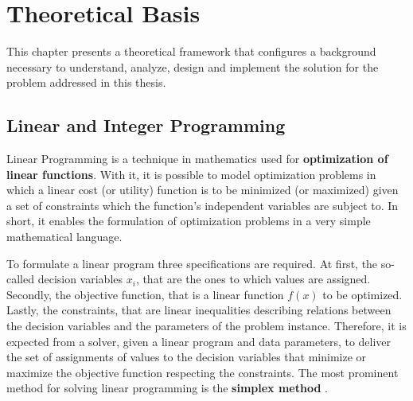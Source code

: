 \documentclass[tuberlin,cic,tc,openright,english,noabntcite,oneside]{iiufrgs}
\begin{document}
\chapter{Theoretical Basis}
This chapter presents a theoretical framework that configures a background necessary to understand, analyze, design and implement the solution for the problem addressed in this thesis.


\section{Linear and Integer Programming}
Linear Programming is a technique in mathematics used for \textbf{optimization of linear functions}. With it, it is possible to model optimization problems in which a linear cost (or utility) function is to be minimized (or maximized) given a set of constraints which the function's independent variables are subject to. In short, it enables the formulation of optimization problems in a very simple mathematical language.

To formulate a linear program three specifications are required. At first, the so-called decision variables $x_{i}$, that are the ones to which values are assigned. Secondly, the objective function, that is a linear function $f(x)$ to be optimized. Lastly, the constraints, that are linear inequalities describing relations between the decision variables and the parameters of the problem instance. Therefore, it is expected from a solver, given a linear program and data parameters, to deliver the set of assignments of values to the decision variables that minimize or maximize the objective function respecting the constraints. The most prominent method for solving linear programming is the \textbf{simplex method} \parencite[p. 5-6]{shenoy_linear_2007}.
\end{document}
